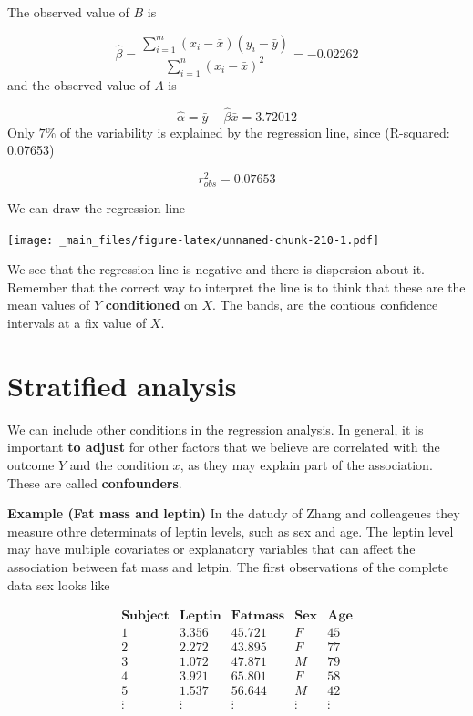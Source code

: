 \documentclass[
]{book}
\begin{document}
The observed value of \(B\) is

\[\hat{\beta}= \frac{\sum_{i=1}^m(x_i-\bar{x})(y_i-\bar{y})}{\sum_{i=1}^n(x_i-\bar{x})^2}= -0.02262\]
and the observed value of \(A\) is

\[\hat{\alpha}=\bar{y}-\hat{\beta}\bar{x}= 3.72012\]
Only \(7\%\) of the variability is explained by the regression line, since (R-squared: 0.07653)

\[r_{obs}^2=0.07653\]

We can draw the regression line

\texttt{[image: \_main\_files/figure-latex/unnamed-chunk-210-1.pdf]}

We see that the regression line is negative and there is dispersion about it. Remember that the correct way to interpret the line is to think that these are the mean values of \(Y\) \textbf{conditioned} on \(X\). The bands, are the contious confidence intervals at a fix value of \(X\).

\hypertarget{stratified-analysis}{%
\section{Stratified analysis}\label{stratified-analysis}}

We can include other conditions in the regression analysis. In general, it is important \textbf{to adjust} for other factors that we believe are correlated with the outcome \(Y\) and the condition \(x\), as they may explain part of the association. These are called \textbf{confounders}.

\textbf{Example (Fat mass and leptin)}
In the datudy of Zhang and colleageues \citep{Zhang2013_adiponectinQTLs} they measure othre determinats of leptin levels, such as sex and age. The leptin level may have multiple covariates or explanatory variables that can affect the association between fat mass and letpin. The first observations of the complete data sex looks like

\[
  \begin{array}{ccccc}
  \mathbf{Subject} & \mathbf{Leptin} & \mathbf{Fatmass} & \mathbf{Sex} & \mathbf{Age} \\ 
1 & 3.356 & 45.721 & F & 45 \\ 
2 & 2.272 & 43.895 & F & 77 \\ 
3 & 1.072 & 47.871 & M & 79 \\ 
4 & 3.921 & 65.801 & F & 58 \\ 
5 & 1.537 & 56.644 & M & 42 \\ 
\vdots & \vdots & \vdots & \vdots & \vdots \\ 
 \end{array}
\]
\end{document}
